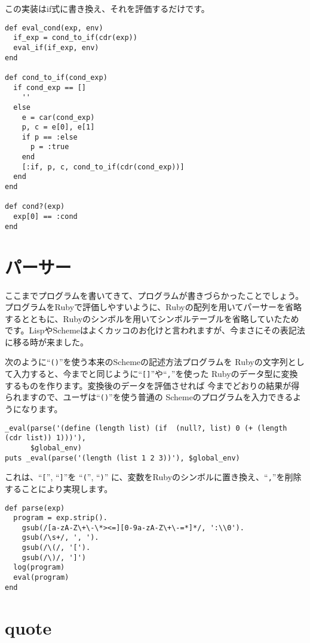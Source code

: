 この実装はif式に書き換え、それを評価するだけです。

\begin{lstlisting}
def eval_cond(exp, env)
  if_exp = cond_to_if(cdr(exp))
  eval_if(if_exp, env)
end

def cond_to_if(cond_exp)
  if cond_exp == []
    ''
  else
    e = car(cond_exp)
    p, c = e[0], e[1]
    if p == :else
      p = :true
    end
    [:if, p, c, cond_to_if(cdr(cond_exp))]
  end  
end

def cond?(exp)
  exp[0] == :cond
end
\end{lstlisting}

\section{パーサー}

ここまでプログラムを書いてきて、プログラムが書きづらかったことでしょう。プログラムをRubyで評価しやすいように、Rubyの配列を用いてパーサーを省略するとともに、Rubyのシンボルを用いてシンボルテーブルを省略していたためです。LispやSchemeはよくカッコのお化けと言われますが、今まさにその表記法に移る時が来ました。

次のように“{\tt ()}”を使う本来のSchemeの記述方法プログラムを
Rubyの文字列として入力すると、今までと同じように“{\tt []}”や“{\tt ,}”を使った
Rubyのデータ型に変換するものを作ります。変換後のデータを評価させれば
今までどおりの結果が得られますので、ユーザは“{\tt ()}”を使う普通の
Schemeのプログラムを入力できるようになります。

\begin{lstlisting}
_eval(parse('(define (length list) (if  (null?, list) 0 (+ (length (cdr list)) 1)))'), 
      $global_env)
puts _eval(parse('(length (list 1 2 3))'), $global_env)
\end{lstlisting}

これは、“{\tt [}”, “{\tt ]}”を “{\tt (}”, “{\tt )}”
に、変数をRubyのシンボルに置き換え、“{\tt ,}”を削除することにより実現します。

\label{fun:parse}

\begin{lstlisting}
def parse(exp)
  program = exp.strip().
    gsub(/[a-zA-Z\+\-\*><=][0-9a-zA-Z\+\-=*]*/, ':\\0').
    gsub(/\s+/, ', ').
    gsub(/\(/, '[').
    gsub(/\)/, ']')
  log(program)
  eval(program)
end
\end{lstlisting}

\section{quote} \label{sec:quote}

